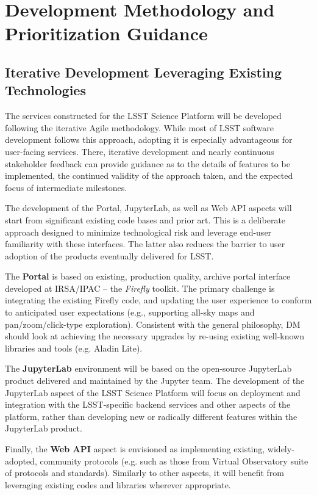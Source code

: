 \section{Development Methodology and Prioritization Guidance\label{sec:methdology}}

\subsection{Iterative Development Leveraging Existing Technologies }

The services constructed for the LSST Science Platform will be developed following the iterative Agile methodology. While most of LSST software development follows this approach, adopting it is especially advantageous for user-facing services. There, iterative development and nearly continuous stakeholder feedback can provide guidance as to the details of features to be implemented, the continued validity of the approach taken, and the expected focus of intermediate milestones.

The development of the Portal, JupyterLab, as well as Web API aspects will start from significant existing code bases and prior art. This is a deliberate approach designed to minimize technological risk and leverage end-user familiarity with these interfaces. The latter also reduces the barrier to user adoption of the products eventually delivered for LSST.

The \textbf{Portal} is based on existing, production quality, archive portal interface developed at IRSA/IPAC -- the \emph{Firefly} toolkit. The primary challenge is integrating the existing Firefly code, and updating the user experience to conform to anticipated user expectations (e.g., supporting all-sky maps and pan/zoom/click-type exploration). Consistent with the general philosophy, DM should look at achieving the necessary upgrades by re-using existing well-known libraries and tools (e.g. Aladin Lite).

The \textbf{JupyterLab} environment will be based on the open-source JupyterLab product delivered and maintained by the Jupyter team. The development of the JupyterLab aspect of the LSST Science Platform will focus on deployment and integration with the LSST-specific backend services and other aspects of the platform, rather than developing new or radically different features within the JupyterLab product.

Finally, the \textbf{Web API} aspect is envisioned as implementing existing, widely-adopted, community protocols (e.g. such as those from Virtual Observatory suite of protocols and standards). Similarly to other aspects, it will benefit from leveraging existing codes and libraries wherever appropriate.

